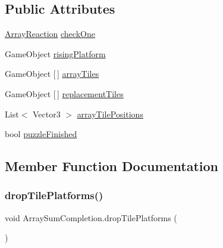 \subsection*{Public Attributes}
\begin{DoxyCompactItemize}
\item 
\hyperlink{class_array_reaction}{Array\+Reaction} \hyperlink{class_array_sum_completion_ac76237e402fcc0e49a59a6e87c5def61}{check\+One}
\item 
Game\+Object \hyperlink{class_array_sum_completion_aede79dd24168cb27103df95c78a78abf}{rising\+Platform}
\item 
Game\+Object \mbox{[}$\,$\mbox{]} \hyperlink{class_array_sum_completion_a18c8b02ee9ab7e991e7e49e97540794b}{array\+Tiles}
\item 
Game\+Object \mbox{[}$\,$\mbox{]} \hyperlink{class_array_sum_completion_a51878c1ec6f821a4d7adff431b4143d1}{replacement\+Tiles}
\item 
List$<$ Vector3 $>$ \hyperlink{class_array_sum_completion_a48661584c0748edee316371617b45b5d}{array\+Tile\+Positions}
\item 
bool \hyperlink{class_array_sum_completion_acbefffe0c43bbd4cd21cfcf34e0a9b7c}{puzzle\+Finished}
\end{DoxyCompactItemize}


\subsection{Member Function Documentation}
\mbox{\label{class_array_sum_completion_ac1c819eeab2598e8c2c2e1e78e15a666}} 
\subsubsection{\texorpdfstring{drop\+Tile\+Platforms()}{dropTilePlatforms()}}
{\footnotesize\ttfamily void Array\+Sum\+Completion.\+drop\+Tile\+Platforms (\begin{DoxyParamCaption}{ }\end{DoxyParamCaption})}

\mbox{\label{class_array_sum_completion_a9c8cbe4d07015cd0e6c958e39e0e92d2}} 
